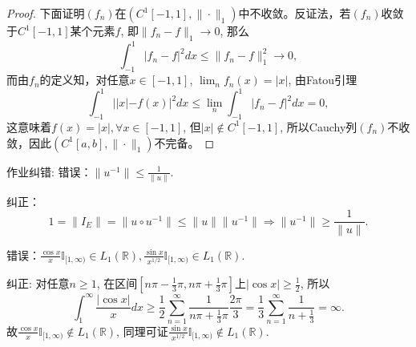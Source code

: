 \documentclass[a4paper,8pt]{ctexart}\textwidth 140mm \textheight 216mm
\newcommand{\8}{\infty}
\begin{document}
\begin{proof}
    下面证明$(f_n)$在$(C^1[-1,1],\|\cdot\|_1)$中不收敛。反证法，若$(f_n)$收敛于$C^1[-1,1]$某个元素$f$, 即$\|f_n-f\|_1\to 0$, 那么
    \begin{equation*}
    	\int_{-1}^1|f_n-f|^2dx\leq \|f_n-f\|_1^2\to 0,
    \end{equation*}
    而由$f_n$的定义知，对任意$x\in[-1,1]$, $\lim_{n}f_n(x)=|x|$, 由Fatou引理
    \begin{equation*}
    	\int_{-1}^1||x|-f(x)|^2dx\leq \lim_{n}\int_{-1}^1|f_n-f|^2dx=0,
    \end{equation*}
    这意味着$f(x)=|x|,\forall x\in[-1,1]$, 但$|x|\notin C^1[-1,1]$, 所以Cauchy列$(f_n)$不收敛，因此$(C^1[a,b],\|\cdot\|_1)$不完备。
\end{proof}

作业纠错: 
错误：$\|u^{-1}\|\leq \frac{1}{\|u\|}$.

纠正：
\begin{equation*}
1=\|I_E\|=\|u\circ u^{-1}\|\leq \|u\|\|u^{-1}\|\Rightarrow \|u^{-1}\|\geq \frac{1}{\|u\|}.
\end{equation*}

错误：$\frac{\cos x}{x}\mathbb{I}_{[1,\infty)}\in L_1(\mathbb{R}),\frac{\sin x}{x^{1/2}}\mathbb{I}_{[1,\infty)}\in L_1(\mathbb{R})$.

纠正: 对任意$n\geq 1$, 在区间$[n\pi-\frac{1}{3}\pi,n\pi+\frac{1}{3}\pi]$上$|\cos x|\geq \frac{1}{2}$, 所以
\begin{equation*}
\int_1^\infty \frac{|\cos x|}{x}dx\geq \frac{1}{2}\sum_{n=1}^\infty \frac{1}{n\pi+\frac{1}{3}\pi}\frac{2\pi}{3}=\frac{1}{3}\sum_{n=1}^\infty\frac{1}{n+\frac{1}{3}}=\infty.
\end{equation*}
故$\frac{\cos x}{x}\mathbb{I}_{[1,\infty)}\notin L_1(\mathbb{R})$, 同理可证$\frac{\sin x}{x^{1/2}}\mathbb{I}_{[1,\infty)}\notin L_1(\mathbb{R})$.
\end{document}
